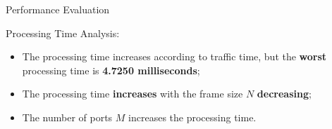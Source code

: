 \documentclass[newPxFont, numfooter, sectionpages]{beamer}
\begin{document}
\begin{frame}{Performance Evaluation}

	Processing Time Analysis:
	\begin{itemize}
		\item The processing time increases according to traffic time, but the \textbf{worst} processing time is \textbf{4.7250 milliseconds};
		\item The processing time \textbf{increases} with the frame size $N$ \textbf{decreasing};
		\item The number of ports $M$ increases the processing time.
	\end{itemize}
	
\end{frame}


\end{document}
